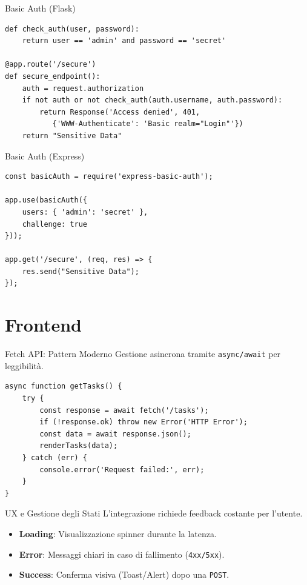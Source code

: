 \documentclass[10pt]{beamer}
\begin{document}
\begin{frame}[fragile]{Basic Auth (Flask)}
    \begin{verbatim}
def check_auth(user, password):
    return user == 'admin' and password == 'secret'

@app.route('/secure')
def secure_endpoint():
    auth = request.authorization
    if not auth or not check_auth(auth.username, auth.password):
        return Response('Access denied', 401, 
           {'WWW-Authenticate': 'Basic realm="Login"'})
    return "Sensitive Data"
    \end{verbatim}
\end{frame}

\begin{frame}[fragile]{Basic Auth (Express)}
    \begin{verbatim}
const basicAuth = require('express-basic-auth');

app.use(basicAuth({
    users: { 'admin': 'secret' },
    challenge: true
}));

app.get('/secure', (req, res) => {
    res.send("Sensitive Data");
});
    \end{verbatim}
\end{frame}

\section{Frontend}
\begin{frame}[fragile]{Fetch API: Pattern Moderno}
    Gestione asincrona tramite \texttt{async/await} per leggibilità.
    \begin{verbatim}
async function getTasks() {
    try {
        const response = await fetch('/tasks');
        if (!response.ok) throw new Error('HTTP Error');
        const data = await response.json();
        renderTasks(data);
    } catch (err) {
        console.error('Request failed:', err);
    }
}
    \end{verbatim}
\end{frame}

\begin{frame}{UX e Gestione degli Stati}
    L'integrazione richiede feedback costante per l'utente.
    \begin{itemize}
        \item \textbf{Loading}: Visualizzazione spinner durante la latenza.
        \item \textbf{Error}: Messaggi chiari in caso di fallimento (\texttt{4xx/5xx}).
        \item \textbf{Success}: Conferma visiva (Toast/Alert) dopo una \texttt{POST}.
    \end{itemize}
\end{frame}
\end{document}
